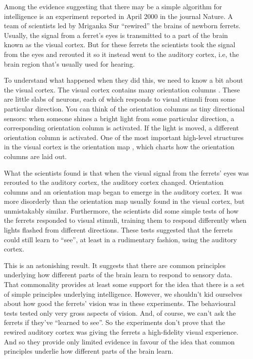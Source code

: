 Among the evidence suggesting that there may be a simple algorithm for intelligence is an experiment reported \cite{Sharma2000} in April 2000 in the journal Nature. A team of scientists led by Mriganka Sur ``rewired'' the brains of newborn ferrets. Usually, the signal from a ferret's eyes is transmitted to a part of the brain known as the visual cortex. But for these ferrets the scientists took the signal from the eyes and rerouted it so it instead went to the auditory cortex, i.e, the brain region that's usually used for hearing.

To understand what happened when they did this, we need to know a bit about the visual cortex. The visual cortex contains many orientation columns \cite{wikipediaOrientationcolumn2019}. These are little slabs of neurons, each of which responds to visual stimuli from some particular direction. You can think of the orientation columns as tiny directional sensors: when someone shines a bright light from some particular direction, a corresponding orientation column is activated. If the light is moved, a different orientation column is activated. One of the most important high-level structures in the visual cortex is the orientation map \cite{wikipediaOrientationmaps2019}, which charts how the orientation columns are laid out.

What the scientists found is that when the visual signal from the ferrets' eyes was rerouted to the auditory cortex, the auditory cortex changed. Orientation columns and an orientation map began to emerge in the auditory cortex. It was more disorderly than the orientation map usually found in the visual cortex, but unmistakably similar. Furthermore, the scientists did some simple tests of how the ferrets responded to visual stimuli, training them to respond differently when lights flashed from different directions. These tests suggested that the ferrets could still learn to ``see'', at least in a rudimentary fashion, using the auditory cortex.

This is an astonishing result. It suggests that there are common principles underlying how different parts of the brain learn to respond to sensory data. That commonality provides at least some support for the idea that there is a set of simple principles underlying intelligence. However, we shouldn't kid ourselves about how good the ferrets' vision was in these experiments. The behavioural tests tested only very gross aspects of vision. And, of course, we can't ask the ferrets if they've ``learned to see''. So the experiments don't prove that the rewired auditory cortex was giving the ferrets a high-fidelity visual experience. And so they provide only limited evidence in favour of the idea that common principles underlie how different parts of the brain learn.

